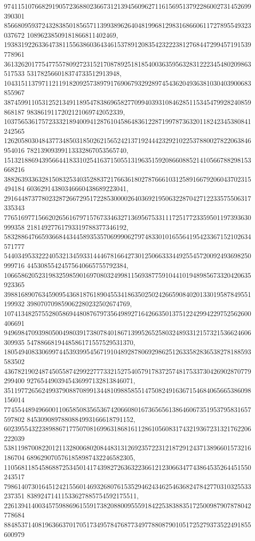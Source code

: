 \documentclass[12pt]{article}
\begin{document}
974115107668291905723688023667312139456096271161569513792286002731452699390301
856680959372432838501856571139938962640481996812983168660611727895549323037672
10896238509181866811402469, 
193831922633647381155638603643461537891208354232223812768447299457191539778961
361326201775477557809272315217087892518185400363595632831222345480209863517533
531782566018374733512913948, 
104315113797112119182092573897917690679329289745436204936381030403900683855967
387459911053125213491189547838696582770994039310846285115345479928240859868187
9838619117202121069742052339, 
103756536175723332189400941287610458648361228719978736320118242345380841242565
126205803048437734850318502621565242137192444232921022537880027822063846954016
78213909399113332867053565740, 
151321886943956644183310254163715055131963515920866088521410566788298153668216
388263933632815083253403528837217663618027876661031258916679206043702315494184
60362914380346660438689223041, 
291644873778023287266729517228530000264036921950632287042712233575506317335343
776516977156620265616797157673346327136956753311172517723359501197393630999358
21814927761793319788377346192, 
583288647665936684434458935357069990627974833010165564195423367152102634571777
544034953322240532134593314446781664273012506633344925545720092493698250999716
44530855424575640665755792384, 
106658620523198325985901697080324998115693877591044101948985673320420635923365
398816890763459095436818761890455341863502502426659084020133019587849551199932
398070709859062280232502674769, 
107413482575528058694480876797356498927164266350137512242994229752562600406691
949698470939805004980391738078401867139952652580324893312157321536624606309935
5478866819448586171557529531370, 
180549408330699744539399545671910489287806929862512633582836538278188593583502
436782190248745055874299227773321527540579178372574817533730426902870779299400
9276544903945436997132813846071, 
351197726562499379088708991344810988585514750824916367154684065665386098156014
774554489496600110658508356536742066080167365656138646067351953795831657597802
8453090897880884993166618791152, 
602395543223898867177507081699631868161128610560831743219367231321762206222039
538119870082201211328006802084483131269235722312187291243713896601573216186704
6896290705761858987432246582305, 
110568118545868872534501417439827263632236612123066347743864535264451550243517
798614073016451242155601469326807615352946243462546368247842770310325533237351
83892471411533627885754592175511, 
226139414003457598869615591738208800955591842253838835172500987907878042778684
884853714081963663701705173495784768773497788087901051725279373522491855600979
\end{document}
